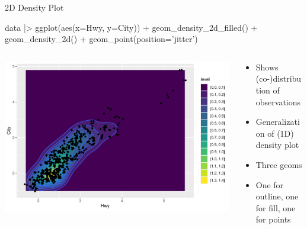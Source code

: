 \documentclass[ignorenonframetext,xcolor=x11names]{beamer}
\begin{document}



\begin{frame}[fragile]{2D Density Plot}
\begin{Rcode}
data |>
  ggplot(aes(x=Hwy, y=City)) + 
    geom_density_2d_filled() + 
    geom_density_2d() +
    geom_point(position='jitter')
\end{Rcode}
\begin{columns}
\begin{column}{.70\textwidth}
  \includegraphics[width=\textwidth]{fuel.density2d.pdf}
\end{column}
\begin{column}{.35\textwidth}
\begin{itemize}
  \item Shows (co-)distribution of observations
  \item Generalization of (1D) density plot
  \item Three geoms
  \item One for outline, one for fill, one for points
\end{itemize}
\end{column}
\end{columns}
\end{frame}
\end{document}
